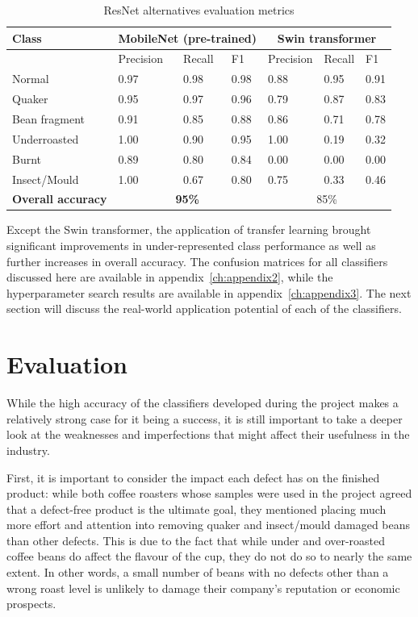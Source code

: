 \begin{table}[h]
    \centering
    \begin{tabular}{*7l}
        \toprule
        \textbf{Class} & \multicolumn{3}{c}{MobileNet (pre-trained)} & \multicolumn{3}{c}{Swin transformer} \\
        \midrule
        {}            & Precision & Recall & F1   & Precision & Recall & F1   \\
        Normal        & 0.97      & 0.98   & 0.98 & 0.88      & 0.95   & 0.91 \\
        Quaker        & 0.95      & 0.97   & 0.96 & 0.79      & 0.87   & 0.83 \\
        Bean fragment & 0.91      & 0.85   & 0.88 & 0.86      & 0.71   & 0.78 \\
        Underroasted  & 1.00      & 0.90   & 0.95 & 1.00      & 0.19   & 0.32 \\
        Burnt         & 0.89      & 0.80   & 0.84 & 0.00      & 0.00   & 0.00 \\
        Insect/Mould  & 1.00      & 0.67   & 0.80 & 0.75      & 0.33   & 0.46 \\
        \midrule
        \textbf{Overall accuracy} & \multicolumn{3}{c}{\textbf{95\%}} & \multicolumn{3}{c}{85\%} \\
        \bottomrule
    \end{tabular}
    \caption{ResNet alternatives evaluation metrics}
    \label{tab:transfer-results-2}
\end{table}
Except the Swin transformer, the application of transfer learning brought significant improvements in
under-represented class performance as well as further increases in overall accuracy.
The confusion matrices for all classifiers discussed here are available in appendix~\ref{ch:appendix2}, while
the hyperparameter search results are available in appendix~\ref{ch:appendix3}.
The next section will discuss the real-world application potential of each of the classifiers.

\section{Evaluation}
\label{sec:evaluation}
While the high accuracy of the classifiers developed during the project makes a relatively strong case for it being a success,
it is still important to take a deeper look at the weaknesses and imperfections that might affect their usefulness in the industry.

First, it is important to consider the impact each defect has on the finished product: while both coffee roasters whose
samples were used in the project agreed that a defect-free product is the ultimate goal, they mentioned placing much more
effort and attention into removing quaker and insect/mould damaged beans than other defects.
This is due to the fact that while under and over-roasted coffee beans do affect the flavour of the cup, they do not
do so to nearly the same extent.
In other words, a small number of beans with no defects other than a wrong roast level is unlikely to damage their company's
reputation or economic prospects.

